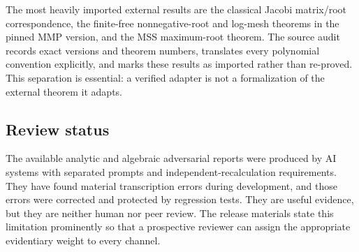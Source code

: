 The most heavily imported external results are the classical Jacobi
matrix/root correspondence, the finite-free nonnegative-root and log-mesh
theorems in the pinned MMP version, and the MSS maximum-root theorem.  The
source audit records exact versions and theorem numbers, translates every
polynomial convention explicitly, and marks these results as imported rather
than re-proved.  This separation is essential: a verified adapter is not a
formalization of the external theorem it adapts.

\subsection{Review status}

The available analytic and algebraic adversarial reports were produced by
AI systems with separated prompts and independent-recalculation requirements.
They have found material transcription errors during development, and those
errors were corrected and protected by regression tests.  They are useful
evidence, but they are neither human nor peer review.  The release materials
state this limitation prominently so that a prospective reviewer can assign
the appropriate evidentiary weight to every channel.
